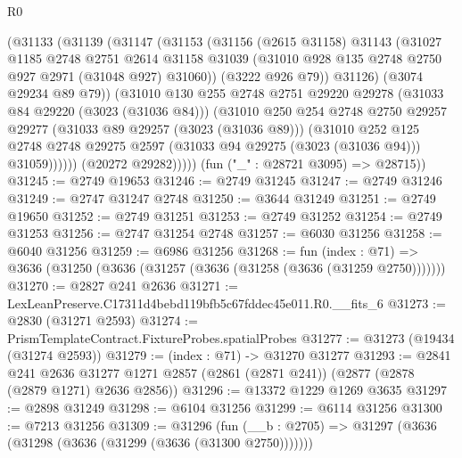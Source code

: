 \begin{lexlean}{R0}
\begin{coremodule}
                (@31133
                  (@31139
                    (@31147
                      (@31153
                        (@31156
                          (@2615 @31158)
                          @31143
                          (@31027
                            @1185
                            @2748
                            @2751
                            @2614
                            @31158
                            @31039
                            (@31010 @928 @135 @2748 @2750 @927 @2971 (@31048 @927) @31060))
                          (@3222 @926 @79))
                        @31126)
                      (@3074 @29234 @89 @79))
                    (@31010
                      @130
                      @255
                      @2748
                      @2751
                      @29220
                      @29278
                      (@31033 @84 @29220 (@3023 (@31036 @84)))
                      (@31010
                        @250
                        @254
                        @2748
                        @2750
                        @29257
                        @29277
                        (@31033 @89 @29257 (@3023 (@31036 @89)))
                        (@31010
                          @252
                          @125
                          @2748
                          @2748
                          @29275
                          @2597
                          (@31033 @94 @29275 (@3023 (@31036 @94)))
                          @31059))))))
              (@20272 @29282)))))
      (fun ("_" : @28721 @3095) => @28715))
@31245 := @2749 @19653
@31246 := @2749 @31245
@31247 := @2749 @31246
@31249 := @2747 @31247 @2748
@31250 := @3644 @31249
@31251 := @2749 @19650
@31252 := @2749 @31251
@31253 := @2749 @31252
@31254 := @2749 @31253
@31256 := @2747 @31254 @2748
@31257 := @6030 @31256
@31258 := @6040 @31256
@31259 := @6986 @31256
@31268 := fun (index : @71) =>
  @3636 (@31250 (@3636 (@31257 (@3636 (@31258 (@3636 (@31259 @2750)))))))
@31270 := @2827 @241 @2636
@31271 := LexLeanPreserve.C17311d4bebd119bfb5c67fddec45e011.R0.__fits_6
@31273 := @2830 (@31271 @2593)
@31274 := PrismTemplateContract.FixtureProbes.spatialProbes
@31277 := @31273 (@19434 (@31274 @2593))
@31279 := (index : @71) -> @31270 @31277
@31293 := @2841
    @241
    @2636
    @31277
    @1271
    @2857
    (@2861 (@2871 @241))
    (@2877 (@2878 (@2879 @1271) @2636 @2856))
@31296 := @13372 @1229 @1269 @3635
@31297 := @2898 @31249
@31298 := @6104 @31256
@31299 := @6114 @31256
@31300 := @7213 @31256
@31309 := @31296
    (fun (__b : @2705) => @31297 (@3636 (@31298 (@3636 (@31299 (@3636 (@31300 @2750)))))))

\end{coremodule}
\end{lexlean}
